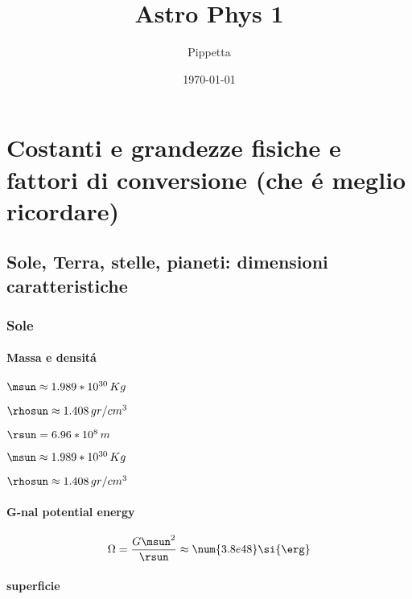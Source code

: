 \documentclass[oneside,12pt,fleqn]{memoir}
\author{Pippetta}
\title{Astro Phys 1}
\date{\today}
\begin{document}
\frontmatter
\maketitle
{}
\tableofcontents*

\mainmatter


\part{Costanti e grandezze fisiche e fattori di conversione (che \'e meglio ricordare)}
 

\chapter{Sole, Terra, stelle, pianeti: dimensioni caratteristiche}
\PartialToc

\section{Sole}

\subsection{Massa e densit\'a}
\begin{itemize*}
\item $\msun\approx1.989*10^{30}\,Kg$
\item $\rhosun\approx1.408 \, gr/cm^3$
\end{itemize*}

\begin{itemize*}
\item $\rsun=6.96*10^8\,m$
\end{itemize*}
\begin{itemize*}
\item $\msun\approx1.989*10^{30}\,Kg$
\item $\rhosun\approx1.408 \, gr/cm^3$
\end{itemize*}

\subsection{G-nal potential energy}

\begin{equation*}
\Omega=\frac{G\msun^2}{\rsun}\approx\num{3.8e48}\si{\erg}
\end{equation*}

\subsection{superficie}
\end{document}
